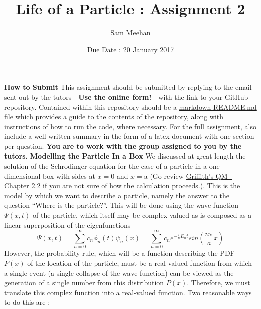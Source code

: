 \documentclass[12pt]{article}
\title{Life of a Particle : Assignment 2}
\author{Sam Meehan}
\date{Due Date : 20 January 2017}
\begin{document}
\maketitle

\textbf{How to Submit}
\newline
This assignment should be submitted by replying to the email sent out by the tutors - \textbf{Use the online form!} - with the link to your GitHub repository.  Contained within this repository should be a \href{https://github.com/adam-p/markdown-here/wiki/Markdown-Cheatsheet}{markdown README.md} file which provides a guide to the contents of the repository, along with instructions of how to run the code, where necessary.  For the full assignment, also include a well-written summary in the form of a latex document with one section per question.
\newline
\newline
\textbf{You are to work with the group assigned to you by the tutors.}
\newline
\newline
\textbf{Modelling the Particle In a Box} 
\newline
We discussed at great length the solution of the Schrodinger equation for the case of a particle in a one-dimensional box with sides at $x=$0 and $x=$a (Go review \href{http://www.fisica.net/mecanica-quantica/Griffiths\%20-\%20Introduction\%20to\%20quantum\%20mechanics.pdf}{Griffith's QM - Chapter 2.2} if you are not sure of how the calculation proceeds.).  This is the model by which we want to describe a particle, namely the answer to the question ``Where is the particle?''.  This will be done using the wave function $\Psi(x,t)$ of the particle, which itself may be complex valued as is composed as a linear superposition of the eigenfunctions 
\begin{displaymath}
 \Psi(x,t)=\displaystyle\sum_{n=0}^{\infty} c_{n}  \phi_{n}(t)  \psi_{n}(x) = \displaystyle\sum_{n=0}^{\infty} c_{n}  e^{-\frac{i}{\hbar}E_{n}t} sin(\frac{n\pi}{a}x)
\end{displaymath}
However, the probability rule, which will be a function describing the PDF $P(x)$ of the location of the particle, must be a real valued function from which a single event (a single collapse of the wave function) can be viewed as the generation of a single number from this distribution $P(x)$.  Therefore, we must translate this complex function into a real-valued function.  Two reasonable ways to do this are :
\end{document}
